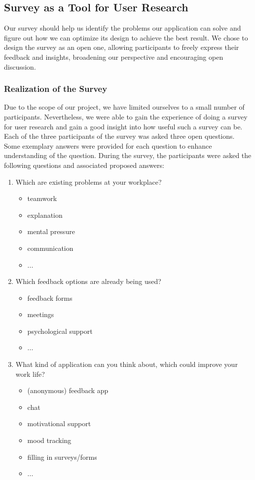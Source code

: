 \documentclass[11pt]{article}
\begin{document}
\subsection{Survey as a Tool for User Research}
Our survey should help us identify the problems our application can solve and figure out how we can optimize its design to achieve the best result. We chose to design the survey as an open one, allowing participants to freely express their feedback and insights, broadening our perspective and encouraging open discussion.

\subsubsection{Realization of the Survey}
Due to the scope of our project, we have limited ourselves to a small number of participants. Nevertheless, we were able to gain the experience of doing a survey for user research and gain a good insight into how useful such a survey can be. Each of the three participants of the survey was asked three open questions. Some exemplary answers were provided for each question to enhance understanding of the question.
During the survey, the participants were asked the following questions and associated proposed answers:
\begin{enumerate}
  \item Which are existing problems at your workplace?
      \begin{itemize}
      \item teamwork
      \item explanation
      \item mental pressure
      \item communication
      \item ...
    \end{itemize}
  \item Which feedback options are already being used?
      \begin{itemize}
      \item feedback forms
      \item meetings
      \item psychological support
      \item ...
    \end{itemize}
  \item What kind of application can you think about, which could improve your work life?
      \begin{itemize}
      \item (anonymous) feedback app 
      \item chat
      \item motivational support 
      \item mood tracking
      \item filling in surveys/forms
      \item ...
    \end{itemize}
\end{enumerate}
\end{document}
